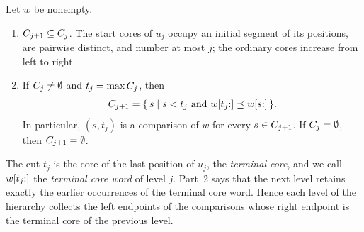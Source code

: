 \begin{lemma}[Cores]\label{lem:cores}
Let $w$ be nonempty.
\begin{enumerate}[leftmargin=*]
\item $C_{j+1} \subseteq C_j$. The start cores of $u_j$ occupy an initial segment
  of its positions, are pairwise distinct, and number at most $j$; the ordinary cores
  increase from left to right.
\item If $C_j \ne \emptyset$ and $t_j = \max C_j$, then
  \[
    C_{j+1} = \{\, s \mid s < t_j \text{ and } w[t_j{:}] \preceq w[s{:}] \,\}.
  \]
  In particular, $(s,t_j)$ is a comparison of $w$ for every $s \in C_{j+1}$. If
  $C_j = \emptyset$, then $C_{j+1} = \emptyset$.
\end{enumerate}
\end{lemma}

The cut $t_j$ is the core of the last position of $u_j$, the \emph{terminal core}, and we
call $w[t_j{:}]$ the \emph{terminal core word} of level $j$. Part~2 says that the next
level retains exactly the earlier occurrences of the terminal core word. Hence each level of the hierarchy
collects the left endpoints of the comparisons whose right endpoint is the terminal core of
the previous level.

